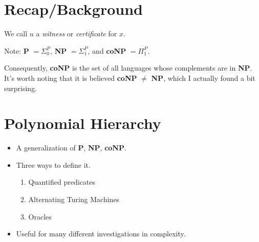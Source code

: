 \documentclass[11pt]{article} %
\begin{document}
\centerline{\LARGE\thishw}

\tableofcontents
\newpage

\section{Recap/Background}


We call $u$ a {\it witness} or {\it certificate} for $x$.

Note: {\bf P} $= \Sigma_0^P$, {\bf NP} $= \Sigma_1^P$, and {\bf coNP} $= \Pi_1^P$.

Consequently, {\bf coNP} is the set of all languages whose complements are in {\bf NP}. It's worth noting that it is believed {\bf coNP} $\neq$ {\bf NP}, which I actually found a bit surprising.

\section{Polynomial Hierarchy}

\begin{itemize}
\item A generalization of {\bf P}, {\bf NP}, {\bf coNP}.
\item Three ways to define it.
\begin{enumerate}
\item Quantified predicates
\item Alternating Turing Machines
\item Oracles
\end{enumerate}
\item Useful for many different investigations in complexity.
\end{itemize}
\end{document}
